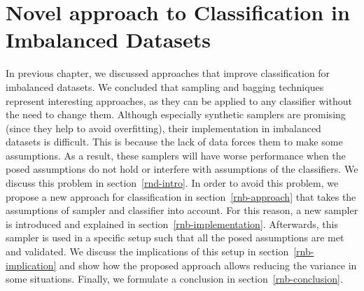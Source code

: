 \chapter{Novel approach to Classification in Imbalanced Datasets}\label{newapproach}
In previous chapter, we discussed approaches that improve classification for imbalanced datasets. We concluded that sampling and bagging techniques represent interesting approaches, as they can be applied to any classifier without the need to change them. Although especially synthetic samplers are promising (since they help to avoid overfitting), their implementation in imbalanced datasets is difficult. This is because the lack of data forces them to make some assumptions. As a result, these samplers will have worse performance when the posed assumptions do not hold or interfere with assumptions of the classifiers. We discuss this problem in section~\ref{rnd-intro}. In order to avoid this problem, we propose a new approach for classification in section~\ref{rnb-approach} that takes the assumptions of sampler and classifier into account. For this reason, a new sampler is introduced and explained in section~\ref{rnb-implementation}. Afterwards, this sampler is used in a specific setup such that all the posed assumptions are met and validated. We discuss the implications of this setup in section~\ref{rnb-implication} and show how the proposed approach allows reducing the variance in some situations. Finally, we formulate a conclusion in section~\ref{rnb-conclusion}.


